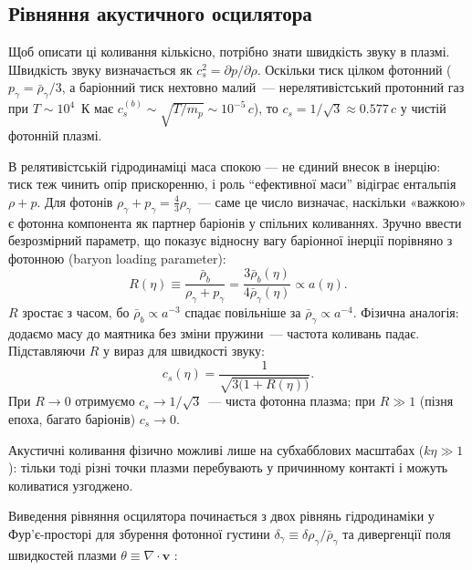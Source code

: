 \documentclass[12pt, a4paper]{article}
\begin{document}
\subsection{Рівняння акустичного осцилятора}

Щоб описати ці коливання кількісно, потрібно знати
швидкість звуку в плазмі.
Швидкість звуку визначається як $c_s^2 = \partial p/\partial\rho$.
Оскільки тиск цілком фотонний ($p_\gamma = \bar{\rho}_\gamma/3$,
а баріонний тиск нехтовно малий~--- нерелятивістський протонний
газ при $T \sim 10^4$~К має $c_s^{(b)} \sim \sqrt{T/m_p}
\sim 10^{-5}\,c$), то $c_s = 1/\sqrt{3} \approx 0.577\,c$
у чистій фотонній плазмі.

В релятивістській гідродинаміці маса спокою --- не єдиний
внесок в інерцію: тиск теж чинить опір прискоренню, і
роль \enquote{ефективної маси} відіграє ентальпія $\rho + p$.
Для фотонів $\rho_\gamma + p_\gamma = \tfrac{4}{3}\rho_\gamma$~---
саме це число визначає, наскільки «важкою» є фотонна компонента
як партнер баріонів у спільних коливаннях. Зручно ввести
безрозмірний параметр, що показує відносну вагу баріонної
інерції порівняно з фотонною (baryon loading parameter):
\begin{equation*}
  R(\eta) \equiv
    \frac{\bar{\rho}_b}{\rho_\gamma + p_\gamma}
    = \frac{3\bar{\rho}_b(\eta)}{4\bar{\rho}_\gamma(\eta)}
    \propto a(\eta).
\end{equation*}
$R$ зростає з часом, бо $\bar{\rho}_b \propto a^{-3}$
спадає повільніше за $\bar{\rho}_\gamma \propto a^{-4}$.
Фізична аналогія: додаємо масу до маятника без зміни
пружини~--- частота коливань падає.
Підставляючи $R$ у вираз для швидкості звуку:
\begin{equation}\label{eq:sound_speed}
  c_s(\eta) = \frac{1}{\sqrt{3\bigl(1 + R(\eta)\bigr)}}.
\end{equation}
При $R \to 0$ отримуємо $c_s \to 1/\sqrt{3}$~--- чиста
фотонна плазма; при $R \gg 1$ (пізня епоха, багато баріонів)
$c_s \to 0$.

Акустичні коливання фізично можливі лише на субхабблових
масштабах ($k\eta \gg 1$): тільки тоді різні точки плазми
перебувають у причинному контакті і можуть коливатися
узгоджено.

Виведення рівняння осцилятора починається з двох рівнянь
гідродинаміки у Фур'є-просторі для збурення фотонної густини
$\delta_\gamma \equiv \delta\rho_\gamma/\bar{\rho}_\gamma$
та дивергенції поля швидкостей плазми $\theta \equiv \nabla\cdot\mathbf{v}$
\cite{dodelson_2020}:
\end{document}

